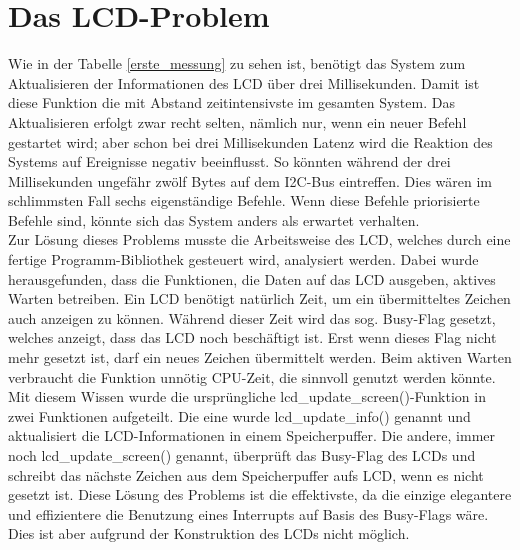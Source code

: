 \section{Das LCD-Problem\label{chapter_lcd_problem}}
Wie in der Tabelle \ref{erste_messung} zu sehen ist, benötigt das System zum Aktualisieren der Informationen
des LCD über drei Millisekunden. Damit ist diese Funktion die mit Abstand zeitintensivste im gesamten System.
Das Aktualisieren erfolgt zwar recht selten, nämlich nur, wenn ein neuer Befehl gestartet wird; aber schon
bei drei Millisekunden Latenz wird die Reaktion des Systems auf Ereignisse negativ beeinflusst.
So könnten während der drei Millisekunden ungefähr zwölf Bytes auf dem I2C-Bus eintreffen.
Dies wären im schlimmsten Fall sechs eigenständige Befehle.
Wenn diese Befehle priorisierte Befehle sind, könnte sich das System anders als erwartet verhalten.\\
Zur Lösung dieses Problems musste die Arbeitsweise des LCD, welches durch eine fertige Programm-Bibliothek
gesteuert wird, analysiert werden. 
Dabei wurde herausgefunden, dass die Funktionen, die Daten auf das LCD ausgeben,
aktives Warten betreiben. Ein LCD benötigt natürlich Zeit, um ein übermitteltes Zeichen auch anzeigen zu können.
Während dieser Zeit wird das sog. Busy-Flag gesetzt, welches anzeigt, dass das LCD noch beschäftigt ist. Erst
wenn dieses Flag nicht mehr gesetzt ist, darf ein neues Zeichen übermittelt werden. Beim aktiven Warten verbraucht die
Funktion unnötig CPU-Zeit, die sinnvoll genutzt werden könnte.\\
Mit diesem Wissen wurde die ursprüngliche lcd\_\-update\_\-screen()-Funktion in zwei Funktionen aufgeteilt. Die eine
wurde lcd\_\-update\_\-info() genannt und aktualisiert die LCD-Informationen in einem Speicherpuffer. Die andere,
immer noch lcd\_\-update\_\-screen() genannt, überprüft das Busy-Flag des LCDs und schreibt das nächste Zeichen aus
dem Speicherpuffer aufs LCD, wenn es nicht gesetzt ist. Diese Lösung des Problems ist die effektivste, da die einzige
elegantere und effizientere die Benutzung eines Interrupts auf Basis des Busy-Flags wäre. Dies ist aber aufgrund der
Konstruktion des LCDs nicht möglich.
